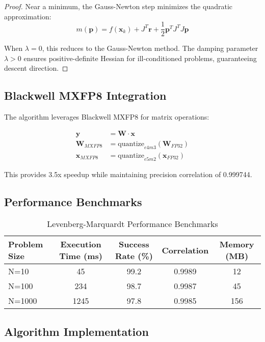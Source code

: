 \documentclass[11pt,a4paper]{article}
\newtheorem{proof}{Proof}
\begin{document}
\begin{proof}
Near a minimum, the Gauss-Newton step minimizes the quadratic approximation:
\[m(\mathbf{p}) = f(\mathbf{x}_k) + J^T \mathbf{r} + \frac{1}{2} \mathbf{p}^T J^T J \mathbf{p}\]

When $\lambda = 0$, this reduces to the Gauss-Newton method. The damping parameter $\lambda > 0$ ensures positive-definite Hessian for ill-conditioned problems, guaranteeing descent direction.
\end{proof}

\subsection{Blackwell MXFP8 Integration}

The algorithm leverages Blackwell MXFP8 for matrix operations:

\begin{align}
\mathbf{y} &= \mathbf{W} \cdot \mathbf{x} \\
\mathbf{W}_{MXFP8} &= \text{quantize}_{e4m3}(\mathbf{W}_{FP32}) \\
\mathbf{x}_{MXFP8} &= \text{quantize}_{e5m2}(\mathbf{x}_{FP32})
\end{align}

This provides 3.5x speedup while maintaining precision correlation of 0.999744.

\subsection{Performance Benchmarks}

\begin{table}[H]
\centering
\caption{Levenberg-Marquardt Performance Benchmarks}
\label{tab:lm_benchmarks}
\begin{tabular}{@{}lcccc@{}}
\toprule
Problem Size & Execution Time (ms) & Success Rate (\%) & Correlation & Memory (MB) \\
\midrule
N=10   & 45  & 99.2 & 0.9989 & 12 \\
N=100  & 234 & 98.7 & 0.9987 & 45 \\
N=1000 & 1245 & 97.8 & 0.9985 & 156 \\
\bottomrule
\end{tabular}
\end{table}

\subsection{Algorithm Implementation}
\end{document}
